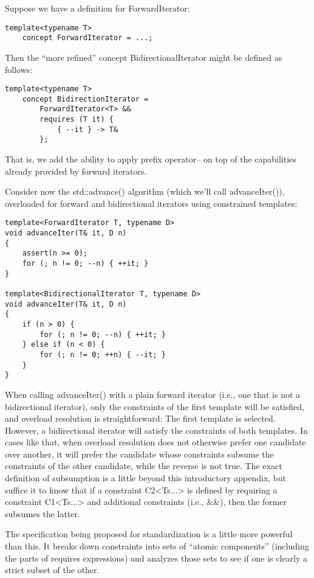 Suppose we have a definition for ForwardIterator:

\begin{lstlisting}[style=styleCXX]
template<typename T>
	concept ForwardIterator = ...;
\end{lstlisting}

Then the “more refined” concept BidirectionalIterator might be defined as follows:

\begin{lstlisting}[style=styleCXX]
template<typename T>
	concept BidirectionIterator =
		ForwardIterator<T> &&
		requires (T it) {
			{ --it } -> T&
		};
\end{lstlisting}

That is, we add the ability to apply prefix operator-- on top of the capabilities already provided by forward iterators.

Consider now the std::advance() algorithm (which we’ll call advanceIter()), overloaded for forward and bidirectional iterators using constrained templates:

\begin{lstlisting}[style=styleCXX]
template<ForwardIterator T, typename D>
void advanceIter(T& it, D n)
{
	assert(n >= 0);
	for (; n != 0; --n) { ++it; }
}

template<BidirectionalIterator T, typename D>
void advanceIter(T& it, D n)
{
	if (n > 0) {
		for (; n != 0; --n) { ++it; }
	} else if (n < 0) {
		for (; n != 0; ++n) { --it; }
	}
}
\end{lstlisting}

When calling advanceIter() with a plain forward iterator (i.e., one that is not a bidirectional iterator), only the constraints of the first template will be satisfied, and overload resolution is straightforward: The first template is selected. However, a bidirectional iterator will satisfy the constraints of both templates. In cases like that, when overload resolution does not otherwise prefer one candidate over another, it will prefer the candidate whose constraints subsume the constraints of the other candidate, while the reverse is not true. The exact definition of subsumption is a little beyond this introductory appendix, but suffice it to know that if a constraint C2<Ts...> is defined by requiring a constraint C1<Ts...> and additional constraints (i.e., \&\&), then the former subsumes the latter.

\begin{tcolorbox}[colback=webgreen!5!white,colframe=webgreen!75!black]
\hspace*{0.75cm}The specification being proposed for standardization is a little more powerful than this. It breaks down constraints into sets of “atomic components” (including the parts of requires expressions) and analyzes those sets to see if one is clearly a strict subset of the other.
\end{tcolorbox}

